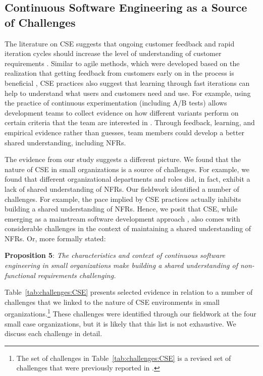 \documentclass[smallextended]{svjour3}
\newcommand\cwproposition[2]{
\normalsize 
\vspace{0.5em}%
\noindent \textbf{\sffamily\fontsize{9}{11}\selectfont Proposition #1}: \textit{#2}
\vspace{0.5em}
}
\begin{document}
\subsection{Continuous Software Engineering as a Source of Challenges}

The literature on CSE suggests that ongoing customer feedback and rapid iteration cycles should increase the level of understanding of customer requirements \citep{bosch2014continuous,fitzgerald2017continuous,klotins2023continuous}. Similar to agile methods, which were developed based on the realization that getting feedback from customers early on in the process is beneficial \citep{williams2003agile}, CSE practices also suggest that learning through fast iterations can help to understand what users and customers need and use. For example, using the practice of continuous experimentation (including A/B tests) allows development teams to collect evidence on how different variants perform on certain criteria that the team are interested in \citep{quin2024b}. Through feedback, learning, and empirical evidence rather than guesses, team members could develop a better shared understanding, including NFRs.



The evidence from our study suggests a different picture. We found that the nature of CSE in small organizations is a source of challenges. For example, we found that different organizational departments and roles did, in fact, exhibit a lack of shared understanding of NFRs. 
Our fieldwork identified a number of challenges. For example, the pace implied by CSE practices actually inhibits building a shared understanding of NFRs. 
Hence, we posit that CSE, while emerging as a mainstream software development approach \citep{klotins2023continuous,bosch2014continuous}, also comes with considerable challenges in the context of maintaining a shared understanding of NFRs. Or, more formally stated:

\cwproposition{5}{The characteristics and context of continuous software engineering in small organizations make building a shared understanding of non-functional requirements challenging.} 




Table~\ref{tab:challenges:CSE} presents selected evidence in relation to a number of challenges that we linked to the nature of CSE environments in small organizations.\footnote{The set of challenges in Table~\ref{tab:challenges:CSE} is a revised set of challenges that were previously reported in  \cite{werner2020re,werner_tse_2021}.} These challenges were identified through our fieldwork at the four small case organizations, but it is likely that this list is not exhaustive. 
We discuss each challenge in detail.
\end{document}
